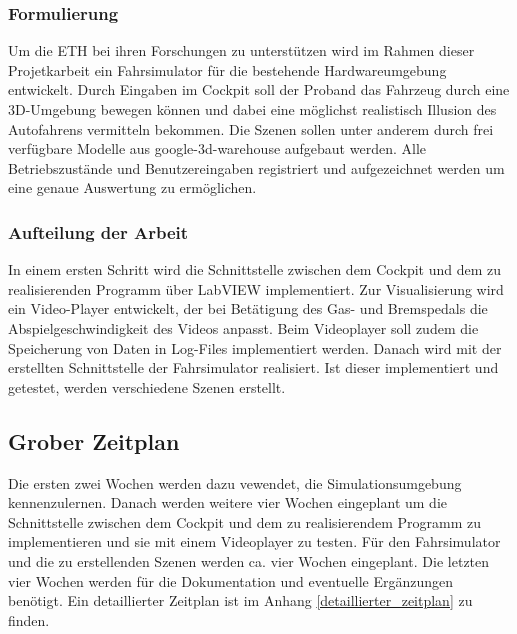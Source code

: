\subsubsection{Formulierung}
Um die ETH bei ihren Forschungen zu unterstützen wird im Rahmen dieser Projetkarbeit ein Fahrsimulator für die bestehende Hardwareumgebung entwickelt. Durch Eingaben im Cockpit soll der Proband das Fahrzeug durch eine 3D-Umgebung bewegen können und dabei eine möglichst realistisch Illusion des Autofahrens vermitteln bekommen. Die Szenen sollen unter anderem durch frei verfügbare Modelle aus \gls{google-3d-warehouse} aufgebaut werden. Alle Betriebszustände und Benutzereingaben registriert und aufgezeichnet werden um eine genaue Auswertung zu ermöglichen. 

\subsubsection{Aufteilung der Arbeit}
In einem ersten Schritt wird die Schnittstelle zwischen dem Cockpit und dem zu realisierenden Programm über LabVIEW implementiert. Zur Visualisierung wird ein Video-Player entwickelt, der bei Betätigung des Gas- und Bremspedals die Abspielgeschwindigkeit des Videos anpasst. Beim Videoplayer soll zudem die Speicherung von Daten in Log-Files  implementiert werden. Danach wird mit der erstellten Schnittstelle der Fahrsimulator realisiert. Ist dieser implementiert und getestet, werden verschiedene Szenen erstellt.

\subsection{Grober Zeitplan}
Die ersten zwei Wochen werden dazu vewendet, die Simulationsumgebung kennenzulernen. Danach werden weitere vier Wochen eingeplant um die Schnittstelle zwischen dem Cockpit und dem zu realisierendem Programm zu implementieren und sie mit einem Videoplayer zu testen. Für den Fahrsimulator und die zu erstellenden Szenen werden ca. vier Wochen eingeplant. Die letzten vier Wochen werden für die Dokumentation und eventuelle Ergänzungen benötigt. Ein detaillierter Zeitplan ist im Anhang \ref{detaillierter_zeitplan} zu finden.